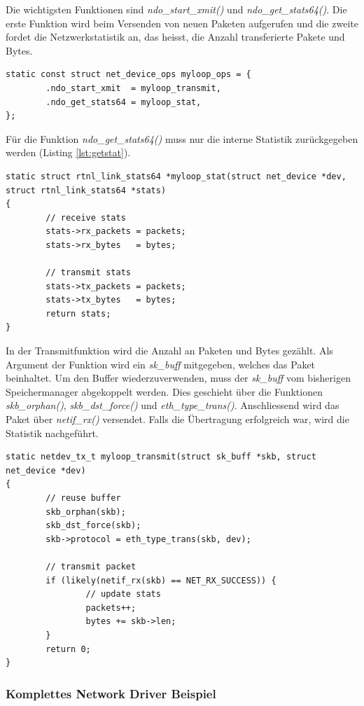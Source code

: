 Die wichtigsten Funktionen sind \emph{ndo\_start\_xmit()} und \emph{ndo\_get\_stats64()}. Die erste Funktion wird beim Versenden von neuen Paketen 
aufgerufen und die zweite fordet die Netzwerkstatistik an, das heisst, die Anzahl transferierte Pakete und Bytes.
\begin{lstlisting}
static const struct net_device_ops myloop_ops = {
        .ndo_start_xmit  = myloop_transmit,
        .ndo_get_stats64 = myloop_stat,
};
\end{lstlisting}

Für die Funktion \emph{ndo\_get\_stats64()} muss nur die interne Statistik zurückgegeben werden (Listing \ref{lst:getstat}).
\begin{lstlisting}[label=lst:getstat,caption=myloop\_stat()]
static struct rtnl_link_stats64 *myloop_stat(struct net_device *dev, struct rtnl_link_stats64 *stats)
{
        // receive stats
        stats->rx_packets = packets;
        stats->rx_bytes   = bytes;

        // transmit stats
        stats->tx_packets = packets;
        stats->tx_bytes   = bytes;
        return stats;
}
\end{lstlisting}

In der Transmitfunktion wird die Anzahl an Paketen und Bytes gezählt. Als Argument der Funktion
wird ein \emph{sk\_buff} mitgegeben, welches das Paket beinhaltet. Um den Buffer wiederzuverwenden,
muss der \emph{sk\_buff} vom bisherigen Speichermanager abgekoppelt werden. Dies geschieht über die
Funktionen \emph{skb\_orphan()}, \emph{skb\_dst\_force()} und \emph{eth\_type\_trans()}. Anschliessend
wird das Paket über \emph{netif\_rx()} versendet. Falls die Übertragung erfolgreich war, wird die Statistik
nachgeführt. 
\begin{lstlisting}[label=lst:nettx,caption=myloop\_transmit]
static netdev_tx_t myloop_transmit(struct sk_buff *skb, struct net_device *dev)
{
        // reuse buffer
        skb_orphan(skb);
        skb_dst_force(skb);
        skb->protocol = eth_type_trans(skb, dev);

        // transmit packet
        if (likely(netif_rx(skb) == NET_RX_SUCCESS)) {
                // update stats
                packets++;
                bytes += skb->len;
        }
        return 0;
}
\end{lstlisting}

\subsubsection{Komplettes Network Driver Beispiel}


